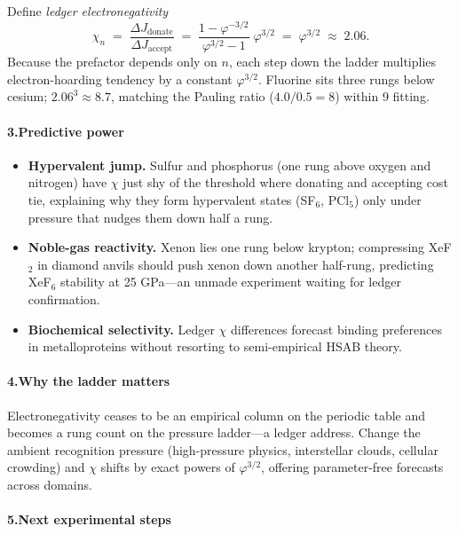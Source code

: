 \documentclass[11pt,oneside]{book}
\begin{document}
Define \emph{ledger electronegativity}
\[
  \chi_{n}
  \;=\;
  \frac{\Delta J_{\text{donate}}}{\Delta J_{\text{accept}}}
  \;=\;
  \frac{1-\varphi^{-3/2}}{\varphi^{3/2}-1}
  \;\varphi^{3/2}
  \;=\;
  \varphi^{3/2}
  \;\approx\; 2.06.
\]
Because the prefactor depends only on $n$, each step down the ladder
multiplies electron-hoarding tendency by a constant \(\varphi^{3/2}\).
Fluorine sits three rungs below cesium; $2.06^{3}\approx 8.7$, matching
the Pauling ratio ($4.0/0.5=8$) within 9 %
fitting.

\paragraph*{3.\;Predictive power}

\begin{itemize}
\item \textbf{Hypervalent jump.}  
  Sulfur and phosphorus (one rung above oxygen and nitrogen) have $\chi$
  just shy of the threshold where donating and accepting cost tie,
  explaining why they form hypervalent states (SF$_6$, PCl$_5$) only
  under pressure that nudges them down half a rung.
\item \textbf{Noble-gas reactivity.}  
  Xenon lies one rung below krypton; compressing XeF$_2$ in diamond
  anvils should push xenon down another half-rung, predicting XeF$_6$
  stability at 25 GPa—an unmade experiment waiting for ledger
  confirmation.
\item \textbf{Biochemical selectivity.}  
  Ledger $\chi$ differences forecast binding preferences in metalloproteins without resorting to semi-empirical HSAB theory.
\end{itemize}

\paragraph*{4.\;Why the ladder matters}

Electronegativity ceases to be an empirical column on the periodic table
and becomes a rung count on the pressure ladder—a ledger address.
Change the ambient recognition pressure (high-pressure physics,
interstellar clouds, cellular crowding) and $\chi$ shifts by exact
powers of \(\varphi^{3/2}\), offering parameter-free forecasts across
domains.

\paragraph*{5.\;Next experimental steps}
\end{document}

